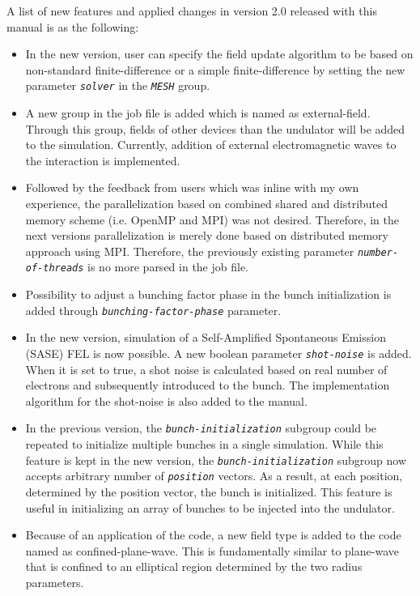 A list of new features and applied changes in version 2.0 released with this manual is as the following:
%
\begin{itemize}
	\setlength{\parskip}{0pt}
	\setlength{\itemsep}{0pt plus 1pt}
	\item In the new version, user can specify the field update algorithm to be based on non-standard finite-difference or a simple finite-difference by setting the new parameter {\tt \small \em solver} in the {\tt \small \em MESH} group.
	\item A new group in the job file is added which is named as external-field. Through this group, fields of other devices than the undulator will be added to the simulation. Currently, addition of external electromagnetic waves to the interaction is implemented.
	\item Followed by the feedback from users which was inline with my own experience, the parallelization based on combined shared and distributed memory scheme (i.e. OpenMP and MPI) was not desired. Therefore, in the next versions parallelization is merely done based on distributed memory approach using MPI. Therefore, the previously existing parameter {\tt \em \small number-of-threads} is no more parsed in the job file.
	\item Possibility to adjust a bunching factor phase in the bunch initialization is added through {\tt \small \em bunching-factor-phase} parameter.
	\item In the new version, simulation of a Self-Amplified Spontaneous Emission (SASE) FEL is now possible. A new boolean parameter {\tt \small \em shot-noise} is added. When it is set to true, a shot noise is calculated based on real number of electrons and subsequently introduced to the bunch. The implementation algorithm for the shot-noise is also added to the manual.
	\item In the previous version, the {\tt \small \em bunch-initialization} subgroup could be repeated to initialize multiple bunches in a single simulation. While this feature is kept in the new version, the {\tt \small \em bunch-initialization} subgroup now accepts arbitrary number of {\tt \small \em position} vectors. As a result, at each position, determined by the position vector, the bunch is initialized. This feature is useful in initializing an array of bunches to be injected into the undulator.
	\item Because of an application of the code, a new field type is added to the code named as confined-plane-wave. This is fundamentally similar to plane-wave that is confined to an elliptical region determined by the two radius parameters.

\end{itemize}
